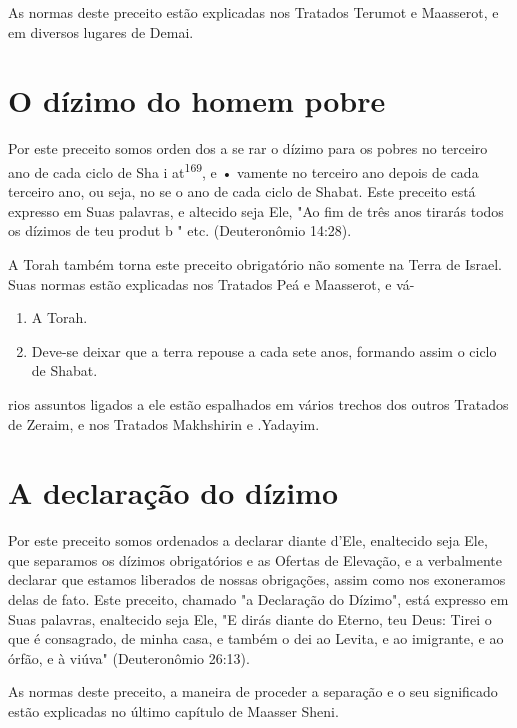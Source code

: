 \begin{itemize}
\begin{enumrate}
\begin{itemize}
\begin{itemize}
\begin{itemize}
As normas deste preceito estão explicadas nos Tratados Terumot e
Maasserot, e em diversos lugares de Demai.

\section{O dízimo do homem pobre}

Por este preceito somos orden dos a se rar o dízimo para os po­bres no
terceiro ano de cada ciclo de Sha i at\textsuperscript{169}, e • vamente
no terceiro ano depois de cada terceiro ano, ou seja, no se o ano de
cada ciclo de Shabat. Este preceito está expresso em Suas palavras, e
altecido seja Ele, "Ao fim de três anos tirarás todos os dízimos de teu
produt b " etc. (Deuteronômio 14:28).

A Torah também torna este preceito obrigatório não somente na Terra de
Israel. Suas normas estão explicadas nos Tratados Peá e Maasserot, e vá-


\begin{enumerate}
\def\labelenumi{\arabic{enumi}.}
\setcounter{enumi}{167}
\item
 
 A Torah.
 
\item
 
 Deve-se deixar que a terra repouse a cada sete anos, formando assim o
 ciclo de Shabat.
 
\end{enumerate}




rios assuntos ligados a ele estão espalhados em vários trechos dos
outros Trata­dos de Zeraim, e nos Tratados Makhshirin e .Yadayim.

\section{A declaração do dízimo}

Por este preceito somos ordenados a declarar diante d'Ele, enalteci­do
seja Ele, que separamos os dízimos obrigatórios e as Ofertas de
Elevação, e a verbalmente declarar que estamos liberados de nossas
obrigações, assim co­mo nos exoneramos delas de fato. Este preceito,
chamado "a Declaração do Dízimo", está expresso em Suas palavras,
enaltecido seja Ele, "E dirás diante do Eterno, teu Deus: Tirei o que é
consagrado, de minha casa, e também o dei ao Levita, e ao imigrante, e
ao órfão, e à viúva" (Deuteronômio 26:13).

As normas deste preceito, a maneira de proceder a separação e o seu
significado estão explicadas no último capítulo de Maasser Sheni.


\end{itemize}
\end{itemize}
\end{itemize}
\end{enumrate}
\end{itemize}
